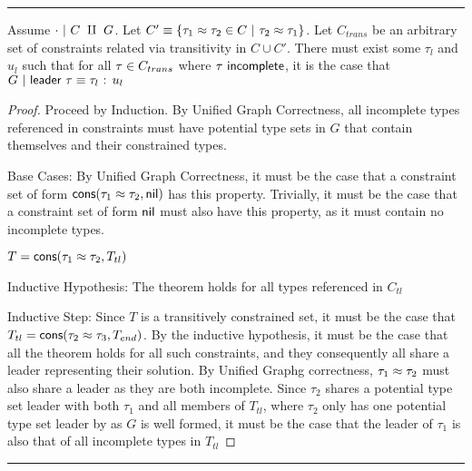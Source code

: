 \noindent\rule{\textwidth}{1pt}

\begin{theorem}[name=Unified Graph Transitivity]
Assume $\cdot~|~C~\amalg~G$. Let $C' \equiv \{ {\tau_1} \approx {\tau_2} \in C ~|~ {\tau_2} \approx {\tau_1} \}$. Let $C_{trans}$ be an arbitrary set of constraints related via transitivity in $C \cup C'$.
There must exist some $\tau_l$ and $u_l$ such that for all $\tau \in C_{trans}$ where $\tau ~ \normalfont\textsf{incomplete}$, it is the case that $G~|~\normalfont\textsf{leader}~\tau \equiv \tau_l\normalfont\textsf{ : }u_l$
\end{theorem}

\begin{proof}
    Proceed by Induction.
    By Unified Graph Correctness, all incomplete types referenced in constraints must have potential type sets in $G$ that contain themselves and their constrained types. 
    
    Base Cases: By Unified Graph Correctness, it must be the case that a constraint set of form $\normalfont\textsf{cons}({\tau_1} \approx {\tau_2}, \normalfont\textsf{nil})$ has this property. Trivially, it must be the case that a constraint set of form $\normalfont\textsf{nil}$ must also have this property, as it must contain no incomplete types.

    $T = \normalfont\textsf{cons}({\tau_1} \approx {\tau_2}, T_{tl})$

    Inductive Hypothesis: The theorem holds for all types referenced in $C_{tl}$

    Inductive Step: Since $T$ is a transitively constrained set, it must be the case that $T_{tl} = \normalfont\textsf{cons}({\tau_2} \approx {\tau_3}, T_{end})$. By the inductive hypothesis, it must be the case that all the theorem holds for all such constraints, and they consequently all share a leader representing their solution. By Unified Graphg correctness, ${\tau_1} \approx {\tau_2}$ must also share a leader as they are both incomplete. Since $\tau_2$ shares a potential type set leader with both $\tau_1$ and all members of $T_{tl}$, where $\tau_2$ only has one potential type set leader by as $G$ is well formed, it must be the case that the leader of $\tau_1$ is also that of all incomplete types in $T_{tl}$  
\end{proof}

\noindent\rule{\textwidth}{1pt}

